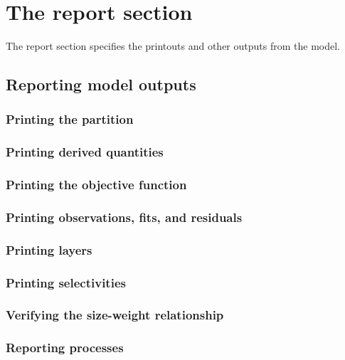 \section{The report section\label{sec:report-section}}

The report section specifies the printouts and other outputs from the model. 

\subsection{Reporting model outputs}

\subsubsection{Printing the partition}

\subsubsection{Printing derived quantities}

\subsubsection{Printing the objective function}

\subsubsection{Printing observations, fits, and residuals}

\subsubsection{Printing layers}

\subsubsection{Printing selectivities}

\subsubsection{Verifying the size-weight relationship\label{sec:report-weight-at-size}}

\subsubsection{Reporting processes}
